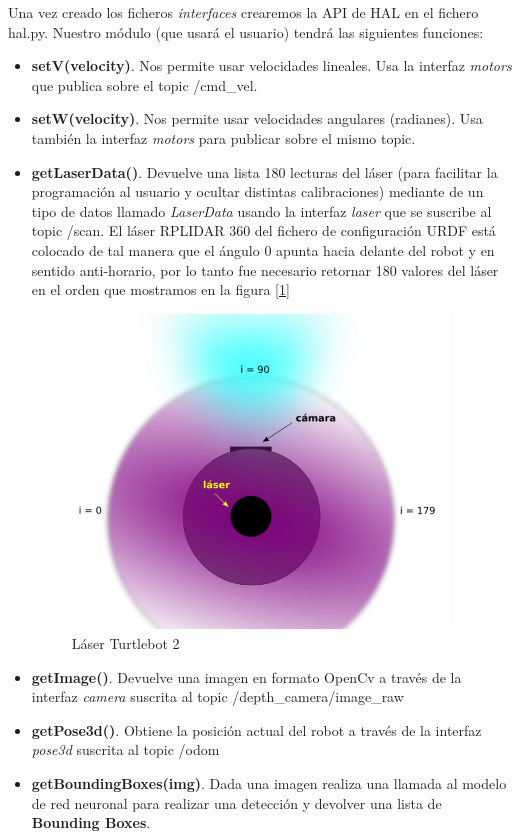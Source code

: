 Una vez creado los ficheros \textit{interfaces} crearemos la API de HAL en el fichero hal.py. Nuestro módulo (que usará el usuario) tendrá las siguientes funciones:\\
\begin{itemize}
	\item \textbf{setV(velocity)}. Nos permite usar velocidades lineales. Usa la interfaz \textit{motors} que publica sobre el topic /cmd\_vel.
	\item \textbf{setW(velocity)}. Nos permite usar velocidades angulares (radianes). Usa también la interfaz \textit{motors} para publicar sobre el mismo topic.
	\item \textbf{getLaserData()}. Devuelve una lista 180 lecturas del láser (para facilitar la programación al usuario y ocultar distintas calibraciones) mediante de un tipo de datos llamado \textit{LaserData} usando la interfaz \textit{laser} que se suscribe al topic /scan. El láser RPLIDAR 360 del fichero de configuración URDF está colocado de tal manera que el ángulo 0 apunta hacia delante del robot y en sentido anti-horario, por lo tanto fue necesario retornar 180 valores del láser en el orden que mostramos en la figura [\ref{fig:vista_planta_turtlebot2}]
\begin{figure} [H]
  \begin{center}
    \includegraphics[width=10cm]{imagenes/vista-planta-turtlebot2.png}
  \end{center}
  \caption[Láser Turtlebot 2]{Láser Turtlebot 2}
  \label{fig:vista_planta_turtlebot2}
\end{figure}
	\item \textbf{getImage()}. Devuelve una imagen en formato OpenCv a través de la interfaz \textit{camera} suscrita al topic /depth\_camera/image\_raw
	\item \textbf{getPose3d()}. Obtiene la posición actual del robot a través de la interfaz \textit{pose3d} suscrita al topic /odom
	\item \textbf{getBoundingBoxes(img)}. Dada una imagen realiza una llamada al modelo de red neuronal para realizar una detección y devolver una lista de \textbf{Bounding Boxes}.  
\end{itemize}\

